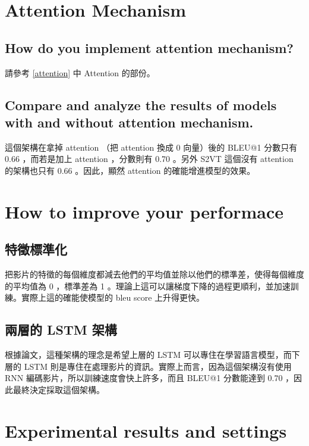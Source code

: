 \documentclass[fleqn,a4paper,12pt]{article}
\begin{document}
\section{Attention Mechanism}


\subsection{How do you implement attention mechanism?}

請參考 \ref{attention} 中 Attention 的部份。

\subsection{Compare and analyze the results of models with and without attention mechanism. }

這個架構在拿掉 attention （把 attention 換成 0 向量）後的 BLEU@1 分數只有 0.66 ，而若是加上 attention ，分數則有 0.70 。另外 S2VT \cite{DBLP:conf/iccv/VenugopalanRDMD15} 這個沒有 attention 的架構也只有 0.66 。因此，顯然 attention 的確能增進模型的效果。

\section{How to improve your performace}

\subsection{特徵標準化}

把影片的特徵的每個維度都減去他們的平均值並除以他們的標準差，使得每個維度的平均值為 0 ，標準差為 1 。理論上這可以讓梯度下降的過程更順利，並加速訓練。實際上這的確能使模型的 bleu score 上升得更快。

\subsection{兩層的 LSTM 架構}

根據論文，這種架構的理念是希望上層的 LSTM 可以專住在學習語言模型，而下層的 LSTM 則是專住在處理影片的資訊。實際上而言，因為這個架構沒有使用 RNN 編碼影片，所以訓練速度會快上許多，而且 BLEU@1 分數能達到 0.70 ，因此最終決定採取這個架構。

\section{Experimental results and settings}
\end{document}
